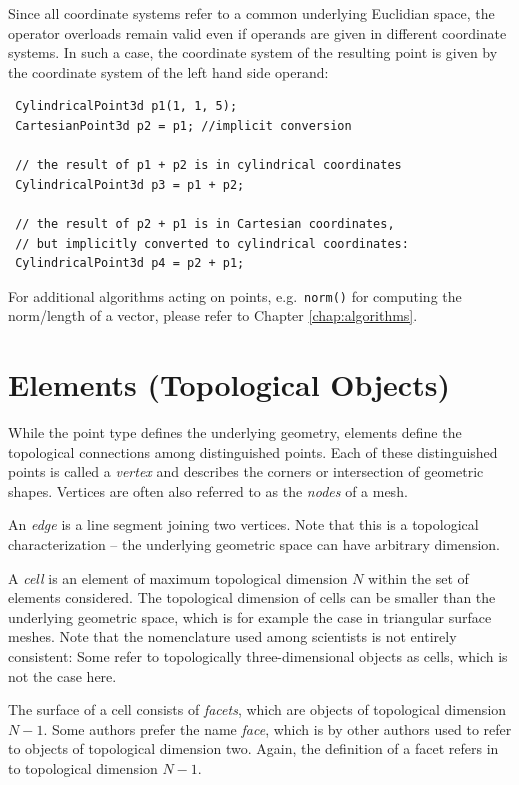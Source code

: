 Since all coordinate systems refer to a common underlying Euclidian space, the operator overloads remain valid even if operands are given in different coordinate systems. In such a case, the coordinate system of the resulting point is given by the coordinate system of the left hand side operand:
\begin{lstlisting}
 CylindricalPoint3d p1(1, 1, 5);
 CartesianPoint3d p2 = p1; //implicit conversion

 // the result of p1 + p2 is in cylindrical coordinates
 CylindricalPoint3d p3 = p1 + p2;

 // the result of p2 + p1 is in Cartesian coordinates,
 // but implicitly converted to cylindrical coordinates:
 CylindricalPoint3d p4 = p2 + p1;
\end{lstlisting}
For additional algorithms acting on points, e.g.~\lstinline|norm()| for computing the norm/length of a vector, please refer to Chapter \ref{chap:algorithms}.



\section{Elements (Topological Objects)}
While the point type defines the underlying geometry, elements define the topological connections among distinguished points. Each of these distinguished points is called a \emph{vertex} and describes the corners or intersection of geometric shapes. Vertices are often also referred to as the \emph{nodes} of a mesh.

An \emph{edge} is a line segment joining two vertices. Note that this is a topological characterization -- the underlying geometric space can have arbitrary dimension.

A \emph{cell} is an element of maximum topological dimension $N$ within the set of elements considered. The topological dimension of cells can be smaller than the underlying geometric space, which is for example the case in triangular surface meshes. Note that the nomenclature used among scientists is not entirely consistent: Some refer to topologically three-dimensional objects as cells, which is not the case here. 

The surface of a cell consists of \emph{facets}, which are objects of topological dimension $N-1$. Some authors prefer the name \emph{face}, which is by other authors used to refer to objects of topological dimension two. Again, the definition of a facet refers in {\ViennaGrid} to topological dimension $N-1$.

